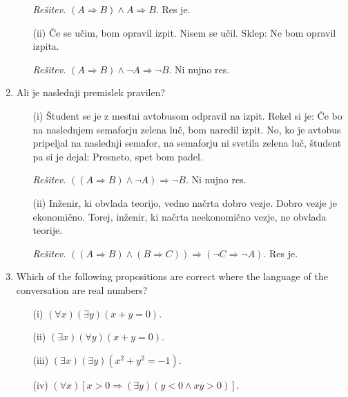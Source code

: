 \documentclass[11pt,paper=b5,footinclude,headinclude]{scrbook} %
\theoremstyle{remark}
\theoremstyle{definition} %
\theoremstyle{theorem} %
\begin{document}
\begin{enumerate}
\begin{enumerate}
\emph{ Rešitev.} $(A\Rightarrow B) \wedge A \Rightarrow B$. Res je.

\item[(ii)] Če se učim, bom opravil izpit. Nisem se učil. Sklep: Ne bom opravil izpita.

\emph{ Rešitev.} $(A\Rightarrow B) \wedge \neg A \Rightarrow \neg B$. Ni nujno res.
\end{enumerate}

\item Ali je naslednji premislek pravilen?
\begin{enumerate}
\item[(i)] Študent se je z mestni avtobusom odpravil na izpit. Rekel si je: Če bo na naslednjem semaforju zelena luč, bom naredil izpit. No, ko je avtobus pripeljal na naslednji semafor, na semaforju ni svetila zelena luč, študent pa si je dejal: Presneto, spet bom padel.

\emph{ Rešitev.} $((A\Rightarrow B) \wedge \neg A) \Rightarrow \neg B$. Ni nujno res.

\item[(ii)] Inženir, ki obvlada teorijo, vedno načrta dobro vezje. Dobro vezje je ekonomično. Torej, inženir, ki načrta neekonomično vezje, ne obvlada teorije. 

\emph{ Rešitev.} $((A\Rightarrow B) \wedge (B\Rightarrow C)) \Rightarrow (\neg C \Rightarrow \neg A)$. Res je.
\end{enumerate}





\item Which of the following propositions are correct where the language of the conversation are real numbers?
\begin{enumerate}
\item[(i)] $(\forall x)(\exists y)(x+y=0)$.
\item[(ii)] $(\exists x)(\forall y)(x+y=0)$.
\item[(iii)] $(\exists x)(\exists y)(x^2+y^2 =-1)$.
\item[(iv)] $(\forall x)[x>0 \Rightarrow (\exists y)(y<0 \wedge xy>0)]$.
\end{enumerate} 
\end{enumerate} 
\end{document}

